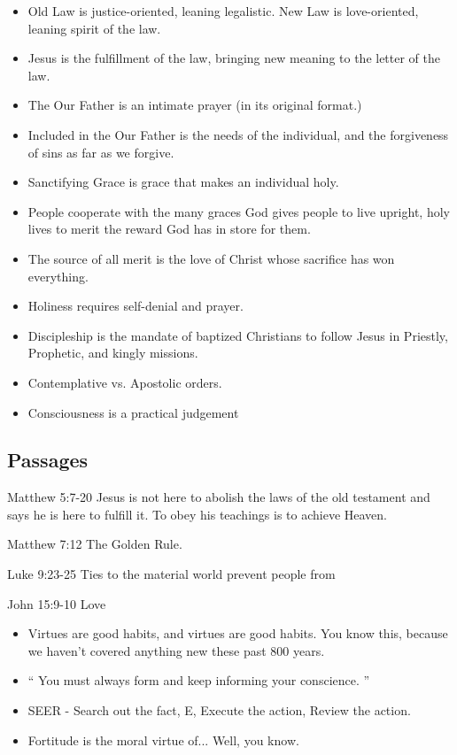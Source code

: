 \documentclass[11pt]{article}
\begin{document}
\begin{itemize}
	\item Old Law is justice-oriented, leaning legalistic.  New Law 
		is love-oriented,	leaning spirit of the law.
	\item Jesus is the fulfillment of the law, bringing new meaning 
		to the letter	of the law.
	\item The Our Father is an intimate prayer (in its original 
		format.)
	\item Included in the Our Father is the needs of the individual,
		and	the forgiveness of sins as far as we forgive.
	\item Sanctifying Grace is grace that makes an individual holy.
	\item People cooperate with the many graces God gives people 
		to live upright, holy lives to merit the reward God has in 
		store	for them.
	\item The source of all merit is the love of Christ whose 
		sacrifice has won everything.
	\item Holiness requires self-denial and prayer.
	\item Discipleship is the mandate of baptized Christians to 
		follow Jesus in Priestly, Prophetic, and kingly missions.
	\item Contemplative vs. Apostolic orders.
	\item Consciousness is a practical judgement
\end{itemize}
\subsection{Passages}
Matthew 5:7-20 
	Jesus is not here to abolish the laws of the old 
	testament	and says he is here to fulfill it.  To obey his
	teachings is to achieve Heaven.

Matthew 7:12
	The Golden Rule.

Luke 9:23-25
	Ties to the material world prevent people from 

John 15:9-10
	Love

\begin{itemize}
	\item Virtues are good habits, and virtues are
		good habits.  You know this, because we haven't
		covered anything new these past 800 years.
	\item `` You must always form and keep informing
		your conscience. ''
	\item SEER - Search out the fact, E, Execute the
		action, Review the action.
	\item Fortitude is the moral virtue of... Well, you know.
\end{itemize}
\end{document}
